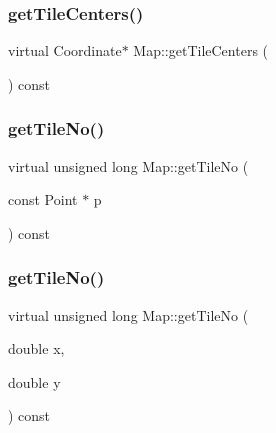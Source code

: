 \subsubsection{\texorpdfstring{get\+Tile\+Centers()}{getTileCenters()}}
{\footnotesize\ttfamily virtual Coordinate$\ast$ Map\+::get\+Tile\+Centers (\begin{DoxyParamCaption}{ }\end{DoxyParamCaption}) const\hspace{0.3cm}{\ttfamily [virtual]}}

\mbox{\label{class_map_af9727bc4d5a77cb35b60d92d0e176171}} 
\subsubsection{\texorpdfstring{get\+Tile\+No()}{getTileNo()}\hspace{0.1cm}{\footnotesize\ttfamily [1/2]}}
{\footnotesize\ttfamily virtual unsigned long Map\+::get\+Tile\+No (\begin{DoxyParamCaption}\item[{const Point $\ast$}]{p }\end{DoxyParamCaption}) const\hspace{0.3cm}{\ttfamily [virtual]}}

\mbox{\label{class_map_ab68490803824fc485652757d992af18e}} 
\subsubsection{\texorpdfstring{get\+Tile\+No()}{getTileNo()}\hspace{0.1cm}{\footnotesize\ttfamily [2/2]}}
{\footnotesize\ttfamily virtual unsigned long Map\+::get\+Tile\+No (\begin{DoxyParamCaption}\item[{double}]{x,  }\item[{double}]{y }\end{DoxyParamCaption}) const\hspace{0.3cm}{\ttfamily [virtual]}}

\mbox{\label{class_map_af3e4dc640ee38ff6e77ab41435fcc42d}} 
